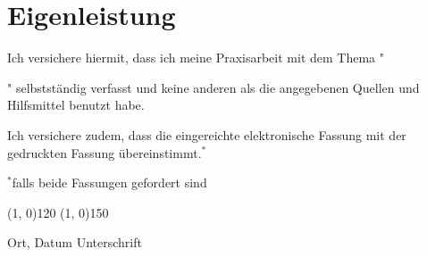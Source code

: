 \chapter*{Eigenleistung}
Ich versichere hiermit, dass ich meine Praxisarbeit mit dem Thema "\title{}" selbstständig verfasst und keine anderen als die angegebenen Quellen und Hilfsmittel benutzt habe.

\noindent Ich versichere zudem, dass die eingereichte elektronische Fassung mit der gedruckten Fassung übereinstimmt.$^*$

\noindent \small $^*$falls beide Fassungen gefordert sind 

\vspace{30pt}

\line(1, 0){120}  \hspace{60pt}  \line(1, 0){150}

Ort, Datum \hspace{120pt} Unterschrift